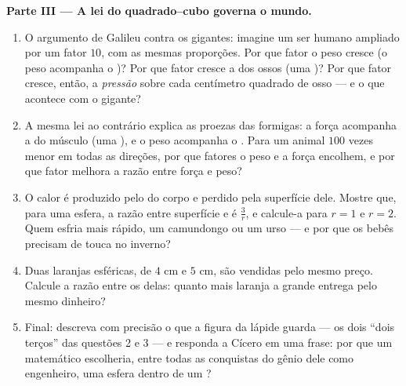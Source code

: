 \begin{problem}
\medskip
\noindent\textbf{Parte III --- A lei do quadrado--cubo governa o
mundo.}
\begin{enumerate}[resume]
  \item O argumento de Galileu contra os gigantes: imagine um ser
        humano ampliado por um fator $10$, com as mesmas proporções.
        Por que fator o peso cresce (o peso acompanha o )? Por
        que fator cresce a  dos ossos (uma )? Por
        que fator cresce, então, a \emph{pressão} sobre cada
        centímetro quadrado de osso --- e o que acontece com o gigante?
  \item A mesma lei ao contrário explica as proezas das formigas: a
        força acompanha a  do músculo (uma ), e o
        peso acompanha o . Para um animal $100$ vezes menor em
        todas as direções, por que fatores o peso e a força encolhem, e
        por que fator melhora a razão entre força e peso?
  \item O calor é produzido pelo  do corpo e perdido pela
        superfície dele. Mostre que, para uma esfera, a razão entre
        superfície e  é $\frac{3}{r}$, e calcule-a para $r = 1$ e
        $r = 2$. Quem esfria mais rápido, um camundongo ou um urso ---
        e por que os bebês precisam de touca no inverno?
  \item Duas laranjas esféricas, de  $4$ cm e $5$ cm, são vendidas
        pelo mesmo preço. Calcule a razão entre os  delas: quanto
        mais laranja a grande entrega pelo mesmo dinheiro?
  \item Final: descreva com precisão o que a figura da lápide guarda
        --- os dois ``dois terços'' das questões 2 e 3 --- e responda a
        Cícero em uma frase: por que um matemático escolheria, entre
        todas as conquistas do gênio dele como engenheiro, uma esfera
        dentro de um ?
\end{enumerate}
\end{problem}

